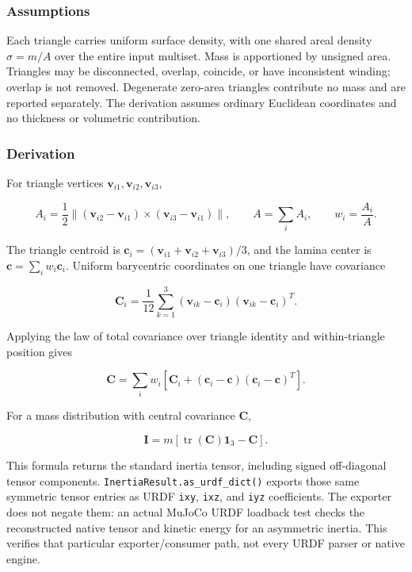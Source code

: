 \documentclass[
  american,
]{article}
\begin{document}
\subsubsection{Assumptions}\label{assumptions-1}

Each triangle carries uniform surface density, with one shared areal
density \(\sigma=m/A\) over the entire input multiset. Mass is
apportioned by unsigned area. Triangles may be disconnected, overlap,
coincide, or have inconsistent winding; overlap is not removed.
Degenerate zero-area triangles contribute no mass and are reported
separately. The derivation assumes ordinary Euclidean coordinates and no
thickness or volumetric contribution.

\subsubsection{Derivation}\label{derivation-1}

For triangle vertices
\(\mathbf{v}_{i1},\mathbf{v}_{i2},\mathbf{v}_{i3}\),

\[
A_i=\frac{1}{2}\left\|
(\mathbf{v}_{i2}-\mathbf{v}_{i1})\times
(\mathbf{v}_{i3}-\mathbf{v}_{i1})\right\|,\qquad
A=\sum_i A_i,\qquad w_i=\frac{A_i}{A}.
\]

The triangle centroid is
\(\mathbf{c}_i=(\mathbf{v}_{i1}+\mathbf{v}_{i2}+
\mathbf{v}_{i3})/3\), and the lamina center is
\(\mathbf{c}=\sum_i w_i\mathbf{c}_i\). Uniform barycentric coordinates
on one triangle have covariance

\[
\mathbf{C}_i=\frac{1}{12}\sum_{k=1}^{3}
(\mathbf{v}_{ik}-\mathbf{c}_i)(\mathbf{v}_{ik}-\mathbf{c}_i)^T.
\]

Applying the law of total covariance over triangle identity and
within-triangle position gives

\protect{}\label{triangle-lamina-covariance}{}

\[
\mathbf{C}=\sum_i w_i\left[\mathbf{C}_i+
(\mathbf{c}_i-\mathbf{c})(\mathbf{c}_i-\mathbf{c})^T\right].
\]

For a mass distribution with central covariance \(\mathbf{C}\),

\protect{}\label{triangle-lamina-inertia}{}

\[
\mathbf{I}=m\left[\operatorname{tr}(\mathbf{C})\mathbf{1}_3-\mathbf{C}\right].
\]

This formula returns the standard inertia tensor, including signed
off-diagonal tensor components. \texttt{InertiaResult.as\_urdf\_dict()}
exports those same symmetric tensor entries as URDF \texttt{ixy},
\texttt{ixz}, and \texttt{iyz} coefficients. The exporter does not
negate them: an actual MuJoCo URDF loadback test checks the
reconstructed native tensor and kinetic energy for an asymmetric
inertia. This verifies that particular exporter/consumer path, not every
URDF parser or native engine.
\end{document}
